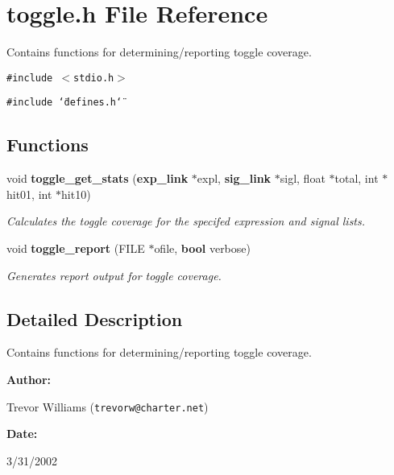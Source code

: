 \section{toggle.h File Reference}
\label{toggle_8h}
Contains functions for determining/reporting toggle coverage. 


{\tt \#include $<$stdio.h$>$}\par
{\tt \#include \char`\"{}defines.h\char`\"{}}\par
\subsection*{Functions}
\begin{CompactItemize}
\item 
void {\bf toggle\_\-get\_\-stats} ({\bf exp\_\-link} $\ast$expl, {\bf sig\_\-link} $\ast$sigl, float $\ast$total, int $\ast$hit01, int $\ast$hit10)
\begin{CompactList}\small\item\em Calculates the toggle coverage for the specifed expression and signal lists.\item\end{CompactList}\item 
void {\bf toggle\_\-report} (FILE $\ast$ofile, {\bf bool} verbose)
\begin{CompactList}\small\item\em Generates report output for toggle coverage.\item\end{CompactList}\end{CompactItemize}


\subsection{Detailed Description}
Contains functions for determining/reporting toggle coverage.



\begin{Desc}
\item[{\bf Author: }]\par
Trevor Williams ({\tt trevorw@charter.net}) \end{Desc}
\begin{Desc}
\item[{\bf Date: }]\par
3/31/2002

\end{Desc}



